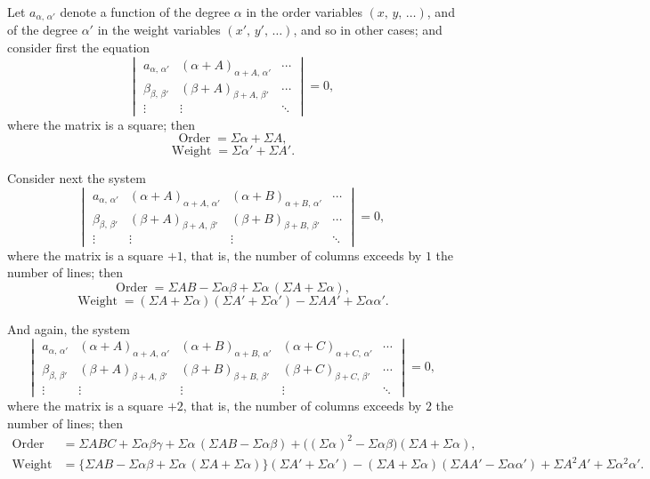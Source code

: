 \documentclass[11pt,a4paper]{article}
\providecommand{\Order}{\operatorname{Order}}
\providecommand{\Weight}{\operatorname{Weight}}
\begin{document}
Let $a_{\alpha,\,\alpha'}$ denote a function of the degree $\alpha$ in the order variables $(x,\,y,\,\ldots)$, and of the degree $\alpha'$ in the weight variables $(x',\,y',\,\ldots)$, and so in other cases; and consider first the equation
\[
\begin{vmatrix}
a_{\alpha,\,\alpha'} & (\alpha + A)_{\alpha + A,\,\alpha'} & \cdots\\
\beta_{\beta,\,\beta'} & (\beta + A)_{\beta + A,\,\beta'} & \cdots\\
\vdots & \vdots & \ddots
\end{vmatrix} = 0,
\]
where the matrix is a square; then
\[
\Order = \Sigma\alpha + \Sigma A,
\]
\[
\Weight = \Sigma\alpha' + \Sigma A'.
\]

Consider next the system
\[
\begin{vmatrix}
a_{\alpha,\,\alpha'} & (\alpha + A)_{\alpha + A,\,\alpha'} & (\alpha + B)_{\alpha + B,\,\alpha'} & \cdots\\
\beta_{\beta,\,\beta'} & (\beta + A)_{\beta + A,\,\beta'} & (\beta + B)_{\beta + B,\,\beta'} & \cdots\\
\vdots & \vdots & \vdots & \ddots
\end{vmatrix} = 0,
\]
where the matrix is a square $+1$, that is, the number of columns exceeds by $1$ the number of lines; then
\[
\Order = \Sigma AB - \Sigma\alpha\beta + \Sigma\alpha\,(\Sigma A + \Sigma\alpha),
\]
\[
\Weight = (\Sigma A + \Sigma\alpha)(\Sigma A' + \Sigma\alpha') - \Sigma A A' + \Sigma\alpha\alpha'.
\]

And again, the system
\[
\begin{vmatrix}
a_{\alpha,\,\alpha'} & (\alpha + A)_{\alpha + A,\,\alpha'} & (\alpha + B)_{\alpha + B,\,\alpha'} & (\alpha + C)_{\alpha + C,\,\alpha'} & \cdots\\
\beta_{\beta,\,\beta'} & (\beta + A)_{\beta + A,\,\beta'} & (\beta + B)_{\beta + B,\,\beta'} & (\beta + C)_{\beta + C,\,\beta'} & \cdots\\
\vdots & \vdots & \vdots & \vdots & \ddots
\end{vmatrix} = 0,
\]
where the matrix is a square $+2$, that is, the number of columns exceeds by $2$ the number of lines; then
\begin{align*}
\Order &= \Sigma ABC + \Sigma\alpha\beta\gamma + \Sigma\alpha\,(\Sigma AB - \Sigma\alpha\beta) + \bigl((\Sigma\alpha)^2 - \Sigma\alpha\beta\bigr)(\Sigma A + \Sigma\alpha),\\
\Weight &= \bigl\{\Sigma AB - \Sigma\alpha\beta + \Sigma\alpha\,(\Sigma A + \Sigma\alpha)\bigr\}(\Sigma A' + \Sigma\alpha') - (\Sigma A + \Sigma\alpha)(\Sigma A A' - \Sigma\alpha\alpha') + \Sigma A^2 A' + \Sigma\alpha^2 \alpha'.
\end{align*}
\end{document}
